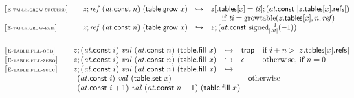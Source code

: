 \vspace{1ex}

$$
\begin{array}[t]{@{}lrcl@{}l@{}}
{[\textsc{\scriptsize E{-}table.grow{-}succeed}]} \quad & z ; {\mathit{ref}}~({\mathit{at}}{.}\mathsf{const}~n)~(\mathsf{table{.}grow}~x) & \hookrightarrow & z{}[{.}\mathsf{tables}{}[x] = {\mathit{ti}}] ; ({\mathit{at}}{.}\mathsf{const}~{|z{.}\mathsf{tables}{}[x]{.}\mathsf{refs}|}) &  \\
&&& \multicolumn{2}{@{}l@{}}{\quad
\quad \mbox{if}~ {\mathit{ti}} = {\mathrm{growtable}}(z{.}\mathsf{tables}{}[x], n, {\mathit{ref}})
} \\
{[\textsc{\scriptsize E{-}table.grow{-}fail}]} \quad & z ; {\mathit{ref}}~({\mathit{at}}{.}\mathsf{const}~n)~(\mathsf{table{.}grow}~x) & \hookrightarrow & z ; ({\mathit{at}}{.}\mathsf{const}~{{{{\mathrm{signed}}}_{{|{\mathit{at}}|}}^{{-1}}}}{({-1})}) \\
\end{array}
$$

\vspace{1ex}

$$
\begin{array}[t]{@{}lrcl@{}l@{}}
{[\textsc{\scriptsize E{-}table.fill{-}oob}]} \quad & z ; ({\mathit{at}}{.}\mathsf{const}~i)~{\mathit{val}}~({\mathit{at}}{.}\mathsf{const}~n)~(\mathsf{table{.}fill}~x) & \hookrightarrow & \mathsf{trap} & \quad \mbox{if}~ i + n > {|z{.}\mathsf{tables}{}[x]{.}\mathsf{refs}|} \\
{[\textsc{\scriptsize E{-}table.fill{-}zero}]} \quad & z ; ({\mathit{at}}{.}\mathsf{const}~i)~{\mathit{val}}~({\mathit{at}}{.}\mathsf{const}~n)~(\mathsf{table{.}fill}~x) & \hookrightarrow & \epsilon & \quad \mbox{otherwise, if}~ n = 0 \\
{[\textsc{\scriptsize E{-}table.fill{-}succ}]} \quad & z ; ({\mathit{at}}{.}\mathsf{const}~i)~{\mathit{val}}~({\mathit{at}}{.}\mathsf{const}~n)~(\mathsf{table{.}fill}~x) & \hookrightarrow & & \\
& \multicolumn{4}{@{}l@{}}{\quad
\begin{array}[t]{@{}l@{}l@{}}
\begin{array}[t]{@{}l@{}} ({\mathit{at}}{.}\mathsf{const}~i)~{\mathit{val}}~(\mathsf{table{.}set}~x) \\
  ({\mathit{at}}{.}\mathsf{const}~i + 1)~{\mathit{val}}~({\mathit{at}}{.}\mathsf{const}~n - 1)~(\mathsf{table{.}fill}~x) \end{array} & \quad \mbox{otherwise} \\
\end{array}
} \\
\end{array}
$$

